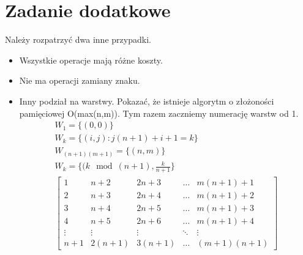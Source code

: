 \documentclass[paper=a4, fontsize=11pt]{article}
\begin{document}
\section{Zadanie dodatkowe}
Należy rozpatrzyć dwa inne przypadki.
\begin{itemize}
\item Wszystkie operacje mają różne koszty.
\item Nie ma operacji zamiany znaku.
\item Inny podział na warstwy. Pokazać, że istnieje algorytm o złożoności pamięciowej O(max(n,m)).
Tym razem zaczniemy numerację warstw od 1.
\begin{gather*}
W_1 = \{(0,0) \} \\
W_k = \{(i,j) : j(n+1) + i + 1 = k\} \\
W_{(n+1)(m+1)} = \{(n, m) \} \\
W_k = \{(k\mod{(n +1)},\frac{k}{n+1}\} \\
\begin{bmatrix}
1 & n + 2 & 2n + 3 & \dots & m(n + 1) + 1 \\
2 & n + 3 & 2n + 4 & \dots & m(n + 1) + 2 \\
3 & n + 4 & 2n + 5 & \dots & m(n + 1) + 3 \\
4 & n + 5 & 2n + 6 & \dots & m(n + 1) + 4\\
\vdots & \vdots & \vdots & \ddots & \vdots \\
n+1 & 2(n+1) & 3(n+1) & \dots & (m+1)(n+1) 
\end{bmatrix}
\end{gather*}
\end{itemize}
\end{document}
